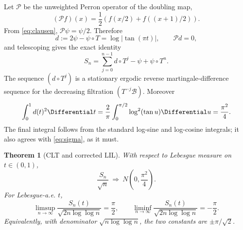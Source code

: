 \documentclass[11pt,oneside]{article}
\newtheorem{theorem}{Theorem}[section]
\theoremstyle{definition}
\theoremstyle{remark}
\begin{document}
Let $\mathcal P$ be the unweighted Perron operator of the doubling map,
\[
 (\mathcal P f)(x)=\frac12\left(f(x/2)+f((x+1)/2)\right).
\]
From \eqref{eq:clausen}, $\mathcal P\psi=\psi/2$.  Therefore
\begin{equation}
 d:=2\psi-\psi\circ T=\log|\tan(\pi t)|,
 \qquad \mathcal P d=0,
 \label{eq:martingale-difference}
\end{equation}
and telescoping gives the exact identity
\begin{equation}
 S_n=\sum_{j=0}^{n-1}d\circ T^j-\psi+\psi\circ T^n.
 \label{eq:Gordin-exact}
\end{equation}
The sequence $(d\circ T^j)$ is a stationary ergodic reverse martingale-difference sequence
for the decreasing filtration $(T^{-j}\mathcal B)$.  Moreover
\begin{equation}
 \int_0^1d(t)^2\Differential t
 =\frac2\pi\int_0^{\pi/2}\log^2(\tan u)\Differential u
 =\frac{\pi^2}{4}.
 \label{eq:d-variance}
\end{equation}
The final integral follows from the standard log-sine and log-cosine integrals; it also
agrees with \eqref{eq:sigma}, as it must.

\begin{theorem}[CLT and corrected LIL]
\label{thm:correct-lil}
With respect to Lebesgue measure on $t\in(0,1)$,
\begin{equation}
 \frac{S_n}{\sqrt n}\ \Longrightarrow\
 N\!\left(0,\frac{\pi^2}{4}\right).
 \label{eq:CLT}
\end{equation}
For Lebesgue-a.e. $t$,
\begin{equation}
 \limsup_{n\to\infty}\frac{S_n(t)}{\sqrt{2n\log\log n}}=\frac\pi2,
 \qquad
 \liminf_{n\to\infty}\frac{S_n(t)}{\sqrt{2n\log\log n}}=-\frac\pi2.
 \label{eq:LIL-correct}
\end{equation}
Equivalently, with denominator $\sqrt{n\log\log n}$, the two constants are
$\pm\pi/\sqrt2$.
\end{theorem}
\end{document}
